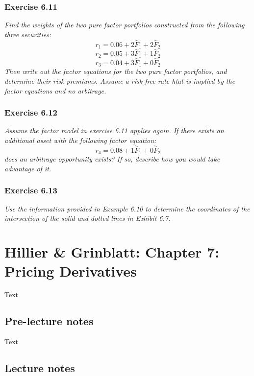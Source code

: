 \documentclass[]{book}
\theoremstyle{definition}
\theoremstyle{definition}
\theoremstyle{remark}
\begin{document}
\subsection{Exercise 6.11}\label{exercise-6.11}

\emph{Find the weights of the two pure factor portfolios constructed
from the following three securities:} \citep[p.199]{book}
\[r_1=0.06+2\overset{\sim}{F}_1+2\overset{\sim}{F}_2\]
\[r_2=0.05+3\overset{\sim}{F}_1+1\overset{\sim}{F}_2\]
\[r_3=0.04+3\overset{\sim}{F}_1+0\overset{\sim}{F}_2\] \emph{Then write
out the factor equations for the two pure factor portfolios, and
determine their risk premiums. Assume a risk-free rate htat is implied
by the factor equations and no arbitrage.} \citep[p.199]{book}

\subsection{Exercise 6.12}\label{exercise-6.12}

\emph{Assume the factor model in exercise 6.11 applies again. If there
exists an additional asset with the following factor equation:}
\citep[p.199]{book}
\[r_4=0.08+1\overset{\sim}{F}_1+0\overset{\sim}{F}_2\] \emph{does an
arbitrage opportunity exists? If so, describe how you would take
advantage of it.} \citep[p.199]{book}

\subsection{Exercise 6.13}\label{exercise-6.13}

\emph{Use the information provided in Example 6.10 to determine the
coordinates of the intersection of the solid and dotted lines in Exhibit
6.7.} \citep[p.199]{book}

\chapter{Hillier \& Grinblatt: Chapter 7: Pricing
Derivatives}\label{hillier-grinblatt-chapter-7-pricing-derivatives}

Text

\section{Pre-lecture notes}\label{pre-lecture-notes-6}

Text

\section{Lecture notes}\label{lecture-notes-6}
\end{document}
